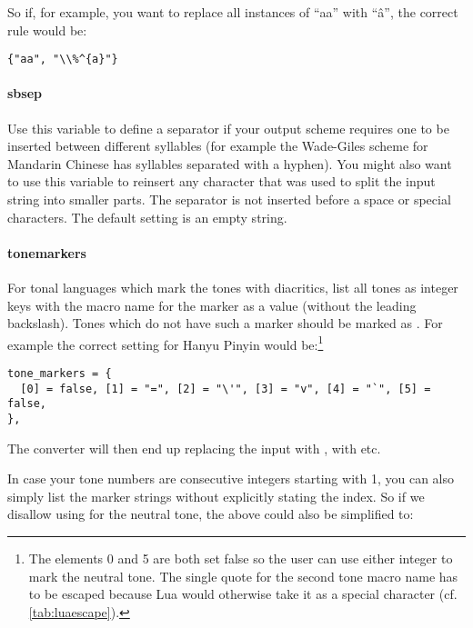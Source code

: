 \documentclass{ltxdockit}
\begin{document}
So if, for example, you want to replace all instances of \enquote{aa} with
\enquote{\^{a}}, the correct rule would be:

\begin{lstlisting}
{"aa", "\\%^{a}"}
\end{lstlisting}

\paragraph{sb\textunderscore{}sep}

Use this variable to define a separator if your output scheme requires one to be
inserted between different syllables (for example the Wade-Giles scheme for
Mandarin Chinese has syllables separated with a hyphen). You might also want to
use this variable to reinsert any character that was used to split the input
string into smaller parts. The separator is not inserted before a space or
special characters. The default setting is an empty string.

\paragraph{tone\textunderscore{}markers}

For tonal languages which mark the tones with diacritics, list all tones as
integer keys with the macro name for the marker as a value (without the
leading backslash). Tones which do not have such a marker should be marked as
. For example the correct setting for Hanyu Pinyin would
be:\footnote{The elements 0 and 5 are both set false so the user can use either
integer to mark the neutral tone. The single quote for the second tone macro
name has to be escaped because Lua would otherwise take it as a special
character (cf. \autoref{tab:luaescape}).}

\begin{lstlisting}
tone_markers = {
  [0] = false, [1] = "=", [2] = "\'", [3] = "v", [4] = "`", [5] = false,
},
\end{lstlisting}

The converter will then end up replacing the input  with
,  with  etc.

In case your tone numbers are consecutive integers starting with 1, you can also
simply list the marker strings without explicitly stating the index. So if we
disallow using  for the neutral tone, the above could also be simplified
to:
\end{document}
